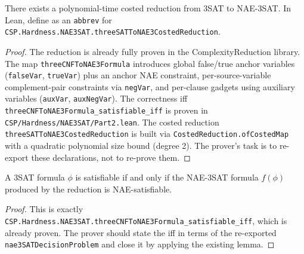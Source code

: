 \begin{theorem}
  \label{thm:three_sat_to_nae3sat}
 \mathlibok
 There exists a polynomial-time costed reduction from 3SAT to NAE-3SAT.
  In Lean, define as an \texttt{abbrev} for
  \texttt{CSP.Hardness.NAE3SAT.threeSATToNAE3CostedReduction}.
\end{theorem}

\begin{proof}
  The reduction is already fully proven in the ComplexityReduction library.
  The map \texttt{threeCNFToNAE3Formula} introduces global false/true anchor
  variables (\texttt{falseVar}, \texttt{trueVar}) plus an anchor NAE
  constraint, per-source-variable complement-pair constraints via
  \texttt{negVar}, and per-clause gadgets using auxiliary variables
  (\texttt{auxVar}, \texttt{auxNegVar}). The correctness iff
  \texttt{threeCNFToNAE3Formula\_satisfiable\_iff} is proven in
  \texttt{CSP/Hardness/NAE3SAT/Part2.lean}. The costed reduction
  \texttt{threeSATToNAE3CostedReduction} is built via
  \texttt{CostedReduction.ofCostedMap} with a quadratic polynomial size
  bound (degree 2). The prover's task is to re-export these declarations,
  not to re-prove them.
\end{proof}

\begin{theorem}
  \label{thm:three_sat_to_nae3sat_correct}
 A 3SAT formula $\phi$ is satisfiable if and only if the NAE-3SAT
  formula $f(\phi)$ produced by the reduction is NAE-satisfiable.
\end{theorem}

\begin{proof}
  This is exactly
  \texttt{CSP.Hardness.NAE3SAT.threeCNFToNAE3Formula\_satisfiable\_iff},
  which is already proven. The prover should state the iff in terms of
  the re-exported \texttt{nae3SATDecisionProblem} and close it by applying
  the existing lemma.
\end{proof}
